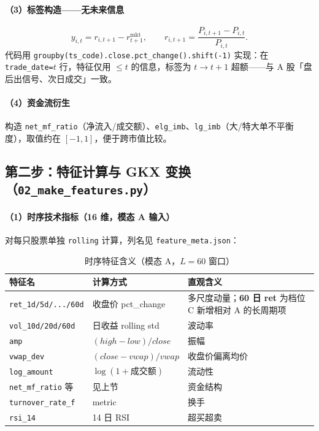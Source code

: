\documentclass[UTF8,a4paper,12pt]{ctexart}
\begin{document}
\paragraph{（3）标签构造——无未来信息}

\begin{equation}
  y_{i,t} = r_{i,t+1} - r^{\mathrm{mkt}}_{t+1},
  \qquad
  r_{i,t+1} = \frac{P_{i,t+1}-P_{i,t}}{P_{i,t}}.
\end{equation}
代码用 \texttt{groupby(ts\_code).close.pct\_change().shift(-1)} 实现：在 \texttt{trade\_date=$t$} 行，特征仅用 $\le t$ 的信息，标签为 $t\!\to\! t\!+\!1$ 超额——与 A 股「盘后出信号、次日成交」一致。

\paragraph{（4）资金流衍生}

构造 \texttt{net\_mf\_ratio}（净流入/成交额）、\texttt{elg\_imb}、\texttt{lg\_imb}（大/特大单不平衡度），取值约在 $[-1,1]$，便于跨市值比较。

\subsection{第二步：特征计算与 GKX 变换（\texttt{02\_make\_features.py}）}

\paragraph{（1）时序技术指标（16 维，模态 A 输入）}

对每只股票单独 \texttt{rolling} 计算，列名见 \texttt{feature\_meta.json}：

\begin{table}[H]
\centering
\caption{时序特征含义（模态 A，$L=60$ 窗口）}
\label{tab:seq-feat}
\small
\begin{tabular}{llp{5.8cm}}
\toprule
\textbf{特征名} & \textbf{计算方式} & \textbf{直观含义} \\
\midrule
\texttt{ret\_1d/5d/.../60d} & 收盘价 pct\_change & 多尺度动量；\textbf{60 日 ret} 为档位 C 新增相对 A 的长周期项 \\
\texttt{vol\_10d/20d/60d}   & 日收益 rolling std & 波动率 \\
\texttt{amp}                & $(high-low)/close$ & 振幅 \\
\texttt{vwap\_dev}          & $(close-vwap)/vwap$ & 收盘价偏离均价 \\
\texttt{log\_amount}        & $\log(1+\text{成交额})$ & 流动性 \\
\texttt{net\_mf\_ratio} 等 & 见上节 & 资金结构 \\
\texttt{turnover\_rate\_f}  & metric & 换手 \\
\texttt{rsi\_14}            & 14 日 RSI & 超买超卖 \\
\bottomrule
\end{tabular}
\end{table}
\end{document}

